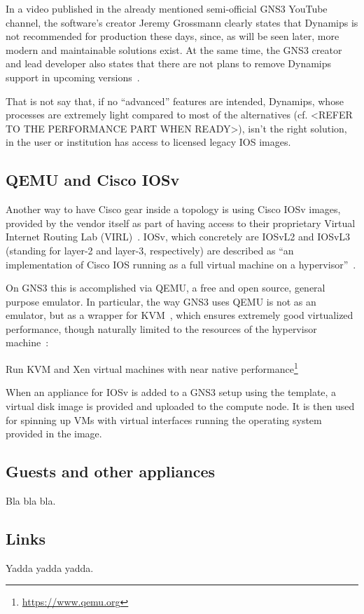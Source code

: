 In a video published in the already mentioned semi-official GNS3 YouTube channel, the software's creator Jeremy Grossmann clearly states that Dynamips is not recommended for production these days, since, as will be seen later, more modern and maintainable solutions exist. At the same time, the GNS3 creator and lead developer also states that there are not plans to remove Dynamips support in upcoming versions~\cite{ytdynamipsvpcs}.

That is not say that, if no ``advanced'' features are intended, Dynamips, whose processes are extremely light compared to most of the alternatives (cf. <REFER TO THE PERFORMANCE PART WHEN READY>), isn't the right solution, in the user or institution has access to licensed legacy IOS images. %

\subsection{QEMU and Cisco IOSv}
\label{subsec:gns3ciscoiosv}

Another way to have Cisco gear inside a topology is using Cisco IOSv images, provided by the vendor itself as part of having access to their proprietary Virtual Internet Routing Lab (VIRL)~\cite{ciscovirl}.
IOSv, which concretely are IOSvL2 and IOSvL3 (standing for layer-2 and layer-3, respectively) are described as ``an implementation of Cisco IOS running as a full virtual machine on a hypervisor''~\cite{ciscoiosvinfo}.

On GNS3 this is accomplished via QEMU, a free and open source, general purpose emulator.
In particular, the way GNS3 uses QEMU is not as an emulator, but as a wrapper for KVM~\cite{whatiskvm}, which ensures extremely good virtualized performance, though naturally limited to the resources of the hypervisor machine~:
\begin{displayquote}
Run KVM and Xen virtual machines with near native performance\footnote{\url{https://www.qemu.org}}
\end{displayquote}

When an appliance for IOSv is added to a GNS3 setup using the template, a virtual disk image is provided and uploaded to the compute node.
It is then used for spinning up VMs with virtual interfaces running the operating system provided in the image. %

\subsection{Guests and other appliances}
\label{subsec:gns3guestsappliances}

Bla bla bla.

\subsection{Links}
\label{subsec:links}

Yadda yadda yadda.


